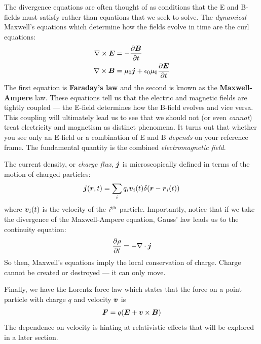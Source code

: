 \documentclass[twocolumn]{gwclass}
\begin{document}
	The divergence equations are often thought of as conditions that the E and B-fields must satisfy rather than equations that we seek to solve. The \emph{dynamical} Maxwell's equations which determine how the fields evolve in time are the curl equations:
	\begin{align*}
		\nabla\times\boldsymbol{E} &= -\frac{\partial \boldsymbol{B}}{\partial t}\\
		\nabla\times\boldsymbol{B} &= \mu_0\boldsymbol{j} + \epsilon_0\mu_0\frac{\partial \boldsymbol{E}}{\partial t}
	\end{align*}
	The first equation is \textbf{Faraday's law} and the second is known as the \textbf{Maxwell-Ampere} law. These equations tell us that the electric and magnetic fields are tightly coupled --- the E-field determines how the B-field evolves and vice versa. This coupling will ultimately lead us to see that we should not (or even \emph{cannot}) treat electricity and magnetism as distinct phenomena. It turns out that whether you see only an E-field or a combination of E and B \emph{depends} on your reference frame. The fundamental quantity is the combined \emph{electromagnetic field}. 
	
	The current density, or \emph{charge flux}, $\boldsymbol{j}$ is microscopically defined in terms of the motion of charged particles:
	$$ \boldsymbol{j}(\boldsymbol{r},t) = \sum_i q_i\boldsymbol{v}_i(t)\delta(\boldsymbol{r} - \boldsymbol{r}_i(t))$$
	where $\boldsymbol{v}_i(t)$ is the velocity of the $i^{\text{\normalfont{th}}}$ particle. Importantly, notice that if we take the divergence of the Maxwell-Ampere equation, Gauss' law leads us to the continuity equation:
	$$ \frac{\partial \rho}{\partial t} = -\nabla\cdot\boldsymbol{j} $$
	So then, Maxwell's equations imply the local conservation of charge. Charge cannot be created or destroyed --- it can only move.
	
	Finally, we have the Lorentz force law which states that the force on a point particle with charge $q$ and velocity $\boldsymbol{v}$ is 
	$$ \boldsymbol{F} = q(\boldsymbol{E} + \boldsymbol{v}\times\boldsymbol{B}) $$
	The dependence on velocity is hinting at relativistic effects that will be explored in a later section.
	
\end{document}
